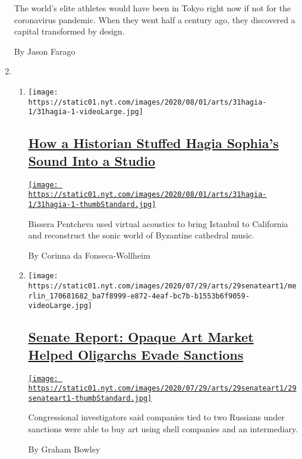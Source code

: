 \begin{enumerate}
  The world's elite athletes would have been in Tokyo right now if not
  for the coronavirus pandemic. When they went half a century ago, they
  discovered a capital transformed by design.

  By Jason Farago
\item
  \begin{enumerate}
  \def\labelenumii{\arabic{enumii}.}
  \item
    \texttt{[image: https://static01.nyt.com/images/2020/08/01/arts/31hagia-1/31hagia-1-videoLarge.jpg]}

    \hypertarget{how-a-historian-stuffed-hagia-sophias-sound-into-a-studio}{%
    \subsection{\texorpdfstring{\href{/2020/07/30/arts/music/hagia-sophia-acoustics-music.html}{How
    a Historian Stuffed Hagia Sophia's Sound Into a
    Studio}}{How a Historian Stuffed Hagia Sophia's Sound Into a Studio}}\label{how-a-historian-stuffed-hagia-sophias-sound-into-a-studio}}

    \href{/2020/07/30/arts/music/hagia-sophia-acoustics-music.html}{\texttt{[image: https://static01.nyt.com/images/2020/08/01/arts/31hagia-1/31hagia-1-thumbStandard.jpg]}}

    Bissera Pentcheva used virtual acoustics to bring Istanbul to
    California and reconstruct the sonic world of Byzantine cathedral
    music.

    By Corinna da Fonseca-Wollheim
  \item
    \texttt{[image: https://static01.nyt.com/images/2020/07/29/arts/29senateart1/merlin\_170681682\_ba7f8999-e872-4eaf-bc7b-b1553b6f9059-videoLarge.jpg]}

    \hypertarget{senate-report-opaque-art-market-helped-oligarchs-evade-sanctions}{%
    \subsection{\texorpdfstring{\href{/2020/07/29/arts/design/senate-report-art-market-russia-oligarchs-sanctions.html}{Senate
    Report: Opaque Art Market Helped Oligarchs Evade
    Sanctions}}{Senate Report: Opaque Art Market Helped Oligarchs Evade Sanctions}}\label{senate-report-opaque-art-market-helped-oligarchs-evade-sanctions}}

    \href{/2020/07/29/arts/design/senate-report-art-market-russia-oligarchs-sanctions.html}{\texttt{[image: https://static01.nyt.com/images/2020/07/29/arts/29senateart1/29senateart1-thumbStandard.jpg]}}

    Congressional investigators said companies tied to two Russians
    under sanctions were able to buy art using shell companies and an
    intermediary.

    By Graham Bowley
  \end{enumerate}
\end{enumerate}

